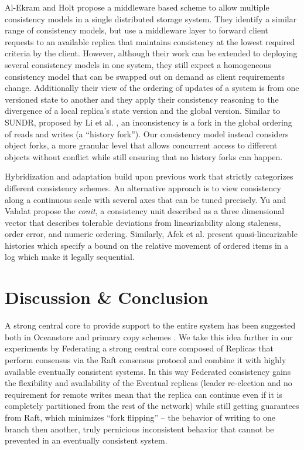 \documentclass[10pt,conference,letterpaper]{IEEEtran}
\begin{document}
Al-Ekram and Holt \cite{al-ekram_multi-consistency_2010} propose a middleware
based scheme to allow multiple consistency models in a single distributed
storage system.
They identify a similar range of consistency models, but use a middleware
layer to forward client requests to an available replica that maintains
consistency at the lowest required criteria by the client.
However, although their work can be extended to deploying several consistency
models in one system, they still expect a homogeneous consistency model that
can be swapped out on demand as client requirements change.
Additionally their view of the ordering of updates of a system is from one
versioned state to another and they apply their consistency reasoning to the
divergence of a local replica's state version and the global version.
Similar to SUNDR, proposed by Li et al.
\cite{li_secure_2004}, an inconsistency is a fork in the global ordering of
reads and writes (a ``history fork'').
Our consistency model instead considers object forks, a more granular level
that allows concurrent access to different objects without conflict while
still ensuring that no history forks can happen.

Hybridization and adaptation build upon previous work that strictly
categorizes different consistency schemes.
An alternative approach is to view consistency along a continuous scale with
several axes that can be tuned precisely.
Yu and Vahdat \cite{yu_design_2002} propose the \textit{conit}, a consistency
unit described as a three dimensional vector that describes tolerable
deviations from linearizability along staleness, order error, and numeric
ordering.
Similarly, Afek et al.
\cite{afek_quasi-linearizability:_2010} present quasi-linearizable histories
which specify a bound on the relative movement of ordered items in a log which
make it legally sequential.

\section{Discussion \& Conclusion}
\label{sec:conclusion}

A strong central core to provide support to the entire system has been suggested both in Oceanstore \cite{kubiatowicz_oceanstore:_2000} and primary copy schemes \cite{gray_dangers_1996}. We take this idea further in our experiments by Federating a strong central core composed of Replicas that perform consensus via the Raft consensus protocol and combine it with highly available eventually consistent systems. In this way Federated consistency gains the flexibility and availability of the Eventual replicas (leader re-election and no requirement for remote writes mean that the replica can continue even if it is completely partitioned from the rest of the network) while still getting guarantees from Raft, which minimizes ``fork flipping'' -- the behavior of writing to one branch then another, truly pernicious inconsistent behavior that cannot be prevented in an eventually consistent system.
\end{document}
